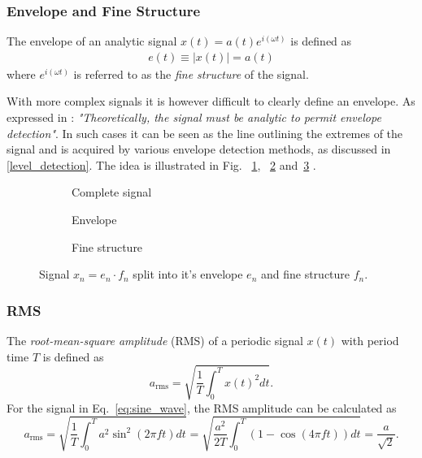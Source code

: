 \documentclass[../main2.tex]{subfiles}
\providecommand{\rootdir}{..}
\begin{document}
\subsubsection{Envelope and Fine Structure}
The envelope of an analytic signal $x(t) = a(t)e^{i(\omega t)}$ is defined as \cite{bedrosian1962analytic}
\begin{align}
e(t) \equiv |x(t)| = a(t)
\end{align}
where $e^{i(\omega t)}$ is referred to as the \emph{fine structure} of the signal.

With more complex signals it is however difficult to clearly define an envelope. As expressed in \cite{bedrosian1962analytic}: \emph{"Theoretically, the signal must be analytic to permit envelope detection"}. In such cases it can be seen as the line outlining the extremes of the signal and is acquired by various envelope detection methods, as discussed in \ref{level_detection}. The idea is illustrated in Fig. ~\ref{fig:signal_env_fine_struct}, ~\ref{fig:signal_env} and~\ref{fig:signal_fine_struct} . 
\begin{figure}
\captionsetup{justification=centering}
\begin{subfigure}{\linewidth}
\centering
\centerline{}
\caption{Complete signal}
\label{fig:signal_env_fine_struct}
\end{subfigure}
\par\bigskip
\begin{subfigure}{.5\linewidth}
\centering

\caption{Envelope}
\label{fig:signal_env}
\end{subfigure}
\begin{subfigure}{.5\linewidth}
\centering

\caption{Fine structure}
\label{fig:signal_fine_struct}
\end{subfigure}%
\caption{Signal $x_n = e_n\cdot f_n$ split into it's envelope $e_n$ and fine structure $f_n$.}
\label{fig:analytic_signal}
\end{figure}

\subsubsection{RMS}
The \emph{root-mean-square amplitude} (RMS) of a periodic signal $x(t)$ with period time $T$ is defined as
\begin{equation}
a_\text{rms} = \sqrt{ \frac{1}{T} \int_{0}^{T} x(t)^2 dt }.
\end{equation}
For the signal in Eq.~\eqref{eq:sine_wave}, the RMS amplitude can be calculated as
\begin{equation}
a_\text{rms} =
\sqrt{ \frac{1}{T} \int_{0}^{T} a^2 \sin^2 (2 \pi f t) dt } =
\sqrt{ \frac{a^2}{2T} \int_{0}^{T}\left( 1 - \cos (4 \pi f t) \right) dt } =
\frac{a}{\sqrt 2}.
\end{equation}
\end{document}
